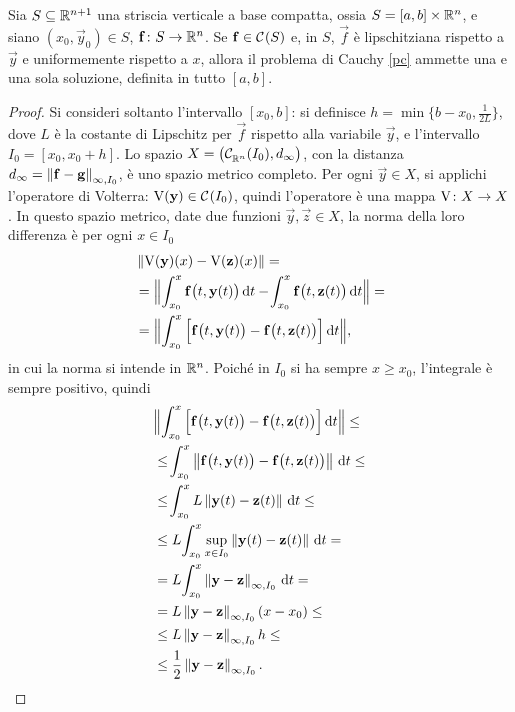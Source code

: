 \begin{teorema} \label{t:E-globale}
Sia $S\subseteq\mathbb{R}^{n+1}$ una striscia verticale a base compatta, ossia $S=[a,b]\times\mathbb{R}^n$, e siano $(x_0,\vec y_0)\in S$, $\mathbf{f}\colon S\to\mathbb{R}^n$. Se $\mathbf{f}\in\mathcal{C}^{{}}(S)$ e, in $S$, $\vec f$ è lipschitziana rispetto a $\vec y$ e uniformemente rispetto a $x$, allora il problema di Cauchy \eqref{pc} ammette una e una sola soluzione, definita in tutto $[a,b]$.
\end{teorema}
\begin{proof}
Si consideri soltanto l'intervallo $[x_0,b]$: si definisce $h=\min\{b-x_0,\frac1{2L}\}$, dove $L$ è la costante di Lipschitz per $\vec f$ rispetto alla variabile $\vec y$, e l'intervallo $I_0=[x_0,x_0+h]$. Lo spazio $X=\big(\mathcal{C}^{{}}_{\mathbb{R}^n}(I_0),d_\infty\big)$, con la distanza $d_{\infty}=\left\|{\mathbf{f}-\mathbf{g}}\right\|_{\infty,I_0}$, è uno spazio metrico completo. Per ogni $\vec y\in X$, si applichi l'operatore di Volterra: $\operatorname{V}(\mathbf{y})\in\mathcal{C}^{{}}(I_0)$, quindi l'operatore è una mappa $\operatorname{V}\colon X\to X$. In questo spazio metrico, date due funzioni $\vec y,\vec z\in X$, la norma della loro differenza è per ogni $x\in I_0$
\begin{align*}
&\left\|{\operatorname{V}(\mathbf{y})(x)-\operatorname{V}(\mathbf{z})(x)}\right\|=\\
&=\Big\|\!\int_{x_0}^x\mathbf{f}\big(t,\mathbf{y}(t)\big)\,\textup{d} t-\!\int_{x_0}^x\mathbf{f}\big(t,\mathbf{z}(t)\big)\,\textup{d} t\Big\|=\\
&=\Big\|\!\int_{x_0}^x\Big[\mathbf{f}\big(t,\mathbf{y}(t)\big)-\mathbf{f}\big(t,\mathbf{z}(t)\big)\Big]\,\textup{d} t\Big\|,
\end{align*}
in cui la norma si intende in $\mathbb{R}^n$. Poiché in $I_0$ si ha sempre $x\geq x_0$, l'integrale è sempre positivo, quindi
\begin{align*}
&\Big\|\Int_{x_0}^x\Big[\vec f\big(t,\vec y(t)\big)-\vec f\big(t,\vec z(t)\big)\Big]\,\dd t\Big\|\leq\\
&\leq\Int_{x_0}^x\norm{\vec f\big(t,\vec y(t)\big)-\vec f\big(t,\vec z(t)\big)}\,\dd t\leq\\
&\leq\Int_{x_0}^xL\norm{\vec y(t)-\vec z(t)}\,\dd t\leq\\
&\leq L\Int_{x_0}^x\sup_{x\in I_0}\norm{\vec y(t)-\vec z(t)}\,\dd t=\\
&=L\Int_{x_0}^x\norm{\vec y-\vec z}_{\infty,I_0}\,\dd t=\\
&=L\norm{\vec y-\vec z}_{\infty,I_0}(x-x_0)\leq\\
&\leq L\norm{\vec y-\vec z}_{\infty,I_0}h\leq\\
&\leq\frac12\norm{\vec y-\vec z}_{\infty,I_0}.

\end{align*}
\end{proof}
